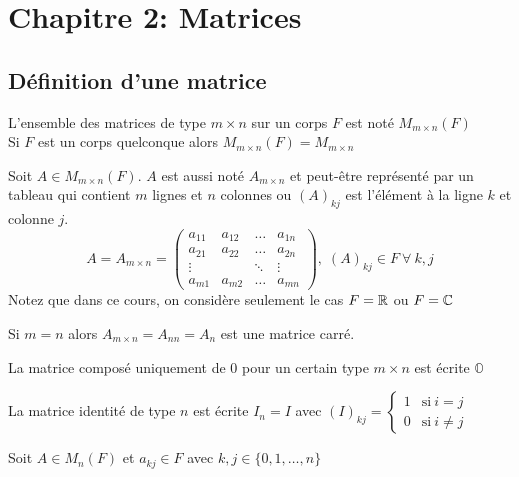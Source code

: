 \section{Chapitre 2: Matrices}

\subsection{Définition d'une matrice}
\noindent
\begin{definition}
    L'ensemble des matrices de type $m \times n$ sur un corps $F$ est noté $M_{m \times n}(F)$ \\
    Si $F$ est un corps quelconque alors $M_{m \times n}(F) = M_{m \times n}$
\end{definition}
\begin{definition}
    Soit $A \in M_{m \times n}(F)$. $A$ est aussi noté $A_{m \times n}$ et peut-être représenté
    par un tableau qui contient $m$ lignes et $n$ colonnes ou $\left(A\right)_{kj}$ est l'élément
    à la ligne $k$ et colonne $j$. \[
        A = A_{m \times n} = \begin{pmatrix}
            a_{11} & a_{12}      & \dots  & a_{1n} \\
            a_{21} & a_{22}      & \dots  & a_{2n} \\
            \vdots & \phantom{a} & \ddots & \vdots \\
            a_{m1} & a_{m2}      & \dots  & a_{mn}
        \end{pmatrix}, \; \left(A\right)_{kj} \in F \ \forall \ k, j
    \]
    Notez que dans ce cours, on considère seulement le cas $F = \mathbb{R}$ ou $F = \mathbb{C}$
\end{definition}
\begin{definition}
    Si $m = n$ alors $A_{m \times n} = A_{nn} = A_n$ est une matrice carré.
\end{definition}
\begin{definition}
    La matrice composé uniquement de 0 pour un certain type $m \times n$ est écrite $\mathbb{O}$
\end{definition}
\begin{definition}
    La matrice identité de type $n$ est écrite $I_n = I$ avec $(I)_{kj} = \begin{cases}
            1 & \text{si} \ i = j    \\
            0 & \text{si} \ i \neq j
        \end{cases}$
\end{definition}
\noindent
Soit $A \in M_n(F)$ et $a_{kj} \in F$ avec $k, j \in \{0, 1, \dots, n\}$
